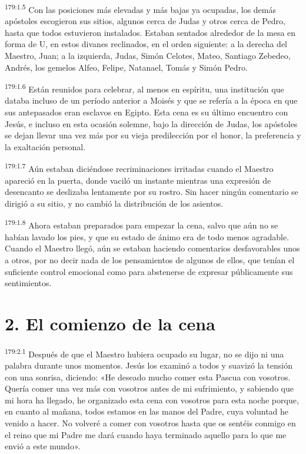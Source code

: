 \par 
\textsuperscript{179:1.5} Con las posiciones más elevadas y más bajas ya ocupadas, los demás apóstoles escogieron sus sitios, algunos cerca de Judas y otros cerca de Pedro, hasta que todos estuvieron instalados. Estaban sentados alrededor de la mesa en forma de U, en estos divanes reclinados, en el orden siguiente: a la derecha del Maestro, Juan; a la izquierda, Judas, Simón Celotes, Mateo, Santiago Zebedeo, Andrés, los gemelos Alfeo, Felipe, Natanael, Tomás y Simón Pedro.

\par 
\textsuperscript{179:1.6} Están reunidos para celebrar, al menos en espíritu, una institución que databa incluso de un período anterior a Moisés y que se refería a la época en que sus antepasados eran esclavos en Egipto. Esta cena es su último encuentro con Jesús, e incluso en esta ocasión solemne, bajo la dirección de Judas, los apóstoles se dejan llevar una vez más por su vieja predilección por el honor, la preferencia y la exaltación personal.

\par 
\textsuperscript{179:1.7} Aún estaban diciéndose recriminaciones irritadas cuando el Maestro apareció en la puerta, donde vaciló un instante mientras una expresión de desencanto se deslizaba lentamente por su rostro. Sin hacer ningún comentario se dirigió a su sitio, y no cambió la distribución de los asientos.

\par 
\textsuperscript{179:1.8} Ahora estaban preparados para empezar la cena, salvo que aún no se habían lavado los pies, y que su estado de ánimo era de todo menos agradable. Cuando el Maestro llegó, aún se estaban haciendo comentarios desfavorables unos a otros, por no decir nada de los pensamientos de algunos de ellos, que tenían el suficiente control emocional como para abstenerse de expresar públicamente sus sentimientos.

\section*{2. El comienzo de la cena}
\par 
\textsuperscript{179:2.1} Después de que el Maestro hubiera ocupado su lugar, no se dijo ni una palabra durante unos momentos. Jesús los examinó a todos y suavizó la tensión con una sonrisa, diciendo: «He deseado mucho comer esta Pascua con vosotros. Quería comer una vez más con vosotros antes de mi sufrimiento, y sabiendo que mi hora ha llegado, he organizado esta cena con vosotros para esta noche porque, en cuanto al mañana, todos estamos en las manos del Padre, cuya voluntad he venido a hacer. No volveré a comer con vosotros hasta que os sentéis conmigo en el reino que mi Padre me dará cuando haya terminado aquello para lo que me envió a este mundo».

